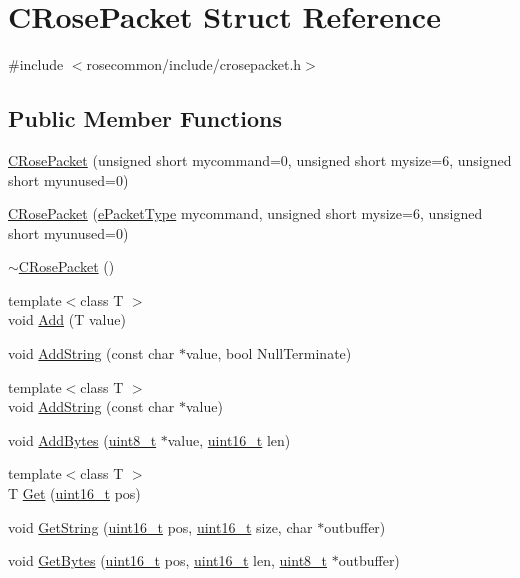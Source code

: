 \hypertarget{structCRosePacket}{}\section{C\+Rose\+Packet Struct Reference}
\label{structCRosePacket}


{\ttfamily \#include $<$rosecommon/include/crosepacket.\+h$>$}

\subsection*{Public Member Functions}
\begin{DoxyCompactItemize}
\item 
\hyperlink{structCRosePacket_ae7848891c9457f8c578995b4b4d58359}{C\+Rose\+Packet} (unsigned short mycommand=0, unsigned short mysize=6, unsigned short myunused=0)
\item 
\hyperlink{structCRosePacket_acdcaf4eeecd44324960439ebf4d786bd}{C\+Rose\+Packet} (\hyperlink{ePacketType_8h_a2a965119c4d90d5c950a46668d0792be}{e\+Packet\+Type} mycommand, unsigned short mysize=6, unsigned short myunused=0)
\item 
\hyperlink{structCRosePacket_a2b5a934eb6806afd6e2e8f37dad0b06b}{$\sim$\+C\+Rose\+Packet} ()
\item 
{\footnotesize template$<$class T $>$ }\\void \hyperlink{structCRosePacket_a7fd02be7219327f36232b0df977520f4}{Add} (T value)
\item 
void \hyperlink{structCRosePacket_a2cdcb02c7813ee85ddabb13bf68df67a}{Add\+String} (const char $\ast$value, bool Null\+Terminate)
\item 
{\footnotesize template$<$class T $>$ }\\void \hyperlink{structCRosePacket_a24e3581e473dd407edd9efdd4e70855c}{Add\+String} (const char $\ast$value)
\item 
void \hyperlink{structCRosePacket_ac89bdfdb2c0b811cbb37e9c9c3379167}{Add\+Bytes} (\hyperlink{stdint_8h_aba7bc1797add20fe3efdf37ced1182c5}{uint8\+\_\+t} $\ast$value, \hyperlink{stdint_8h_a273cf69d639a59973b6019625df33e30}{uint16\+\_\+t} len)
\item 
{\footnotesize template$<$class T $>$ }\\T \hyperlink{structCRosePacket_a3777bf0e7bccf9a26241dc446e3b4898}{Get} (\hyperlink{stdint_8h_a273cf69d639a59973b6019625df33e30}{uint16\+\_\+t} pos)
\item 
void \hyperlink{structCRosePacket_adffbbff96d3c477849f2870a62c07547}{Get\+String} (\hyperlink{stdint_8h_a273cf69d639a59973b6019625df33e30}{uint16\+\_\+t} pos, \hyperlink{stdint_8h_a273cf69d639a59973b6019625df33e30}{uint16\+\_\+t} size, char $\ast$outbuffer)
\item 
void \hyperlink{structCRosePacket_a3b903f9e7d36960e4215377c27ed5060}{Get\+Bytes} (\hyperlink{stdint_8h_a273cf69d639a59973b6019625df33e30}{uint16\+\_\+t} pos, \hyperlink{stdint_8h_a273cf69d639a59973b6019625df33e30}{uint16\+\_\+t} len, \hyperlink{stdint_8h_aba7bc1797add20fe3efdf37ced1182c5}{uint8\+\_\+t} $\ast$outbuffer)
\end{DoxyCompactItemize}
